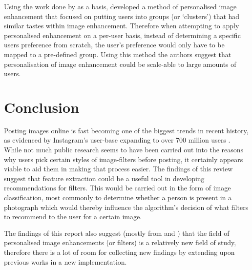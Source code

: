 \documentclass[a4paper,12pt]{report}
\begin{document}
      Using the work done by \cite{kang2010personalization} as a basis, \cite{caicedo2011collaborative} developed a method of personalised image enhancement that focused on putting users into groups (or ‘clusters’) that had similar tastes within image enhancement. Therefore when attempting to apply personalised enhancement on a per-user basis, instead of determining a specific users preference from scratch, the user's preference would only have to be mapped to a pre-defined group. Using this method the authors suggest that personalisation of image enhancement could be scale-able to large amounts of users.


  \newpage

  \section{Conclusion}
    Posting images online is fast becoming one of the biggest trends in recent history, as evidenced by Instagram's user-base expanding to over 700 million users \citep{instagram2017users}. While not much public research seems to have been carried out into the reasons why users pick certain styles of image-filters before posting, it certainly appears viable to aid them in making that process easier.
    The findings of this review suggest that feature extraction could be a useful tool in developing recommendations for filters. This would be carried out in the form of image classification, most commonly to determine whether a person is present in a photograph which would thereby influence the algorithm's decision of what filters to recommend to the user for a certain image.

    The findings of this report also suggest (mostly from \cite{kang2010personalization} and \cite{caicedo2011collaborative}) that the field of personalised image enhancements (or filters) is a relatively new field of study, therefore there is a lot of room for collecting new findings by extending upon previous works in a new implementation.
\end{document}
